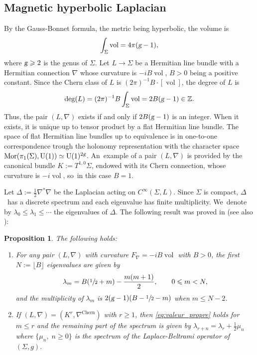 \documentclass[10pt]{amsart}
\theoremstyle{plain}
\newtheorem{proposition}[theorem]{Proposition}
\theoremstyle{definition}
\let\op\operatorname
\newcommand{\Z}{\mathbb{Z}}
\let\la\lambda
\let\Si\Sigma
\DeclareMathOperator{\vol}{vol}
\begin{document}
\subsection{Magnetic hyperbolic Laplacian} \label{ssection:landau} By the Gauss-Bonnet formula, the metric being
hyperbolic, the volume is
\begin{equation}
\int_{\Si} \vol = 4 \pi (\textsl{g} -1),
\end{equation}
where $\textsl{g}\geqslant
2 $ is the genus of $\Si$. Let $L \to \Sigma$ be a Hermitian line bundle with
a Hermitian connection
$\nabla$ whose curvature is $-i B \op{vol}
$, $B > 0$ being a positive constant. Since the Chern class of $L$ is $ (2
\pi)^{-1} B \cdot [ \op{vol}]$, the
degree of $L$ is
\begin{equation}
\label{equation:deg}
\mathrm{deg}(L) = (2 \pi)^{-1} B \int_{\Si} \vol = 2 B (\textsl{g}-1) \in \Z.
\end{equation}
Thus, the pair $(L,
\nabla)$ exists if and only if $2 B (\textsl{g}-1)$ is an integer. When it exists, it
is unique up to tensor product by a flat Hermitian line bundle. The
space of flat Hermitian line bundles up to equivalence is in one-to-one
correspondence trough the holonomy representation with the character space
$\op{Mor} (\pi_1 (\Si), \op{U}(1)) \simeq \op{U} (1)^{2\textsl{g}}$. An~example of a pair $(L, \nabla)$ is provided by the canonical bundle $K := T^{1,0} \Si$,
endowed with its Chern connection, whose curvature is $- i \vol$, so~in this
case $B=1$.

Let $\Delta := \frac{1}{2} \nabla^* \nabla $ be the Laplacian acting on $C^\infty
(\Si, L)$. Since $\Si$ is compact, $\Delta$~has a discrete spectrum and each
eigenvalue has finite multiplicity. We~denote by $\la_0 \leqslant \la_1
\leqslant \cdots $ the eigenvalues of $\Delta$. The following result was
proved in \cite{Iengo-Li-94} (see also \cite{Tejero-06, Landau2}):

\begin{proposition} \label{theo:Landau_Level}
The following holds:
\begin{enumerate}

\item For any pair $(L, \nabla)$ with curvature $F_\nabla=-iB
\op{vol}$ with $B>0$, the first $N := \lfloor B \rfloor $ eigenvalues are
given by
\begin{gather} \label{eq:valeur_propre}
\la_{m } = B (\sfrac{1}{2} + m) - \dfrac{ m (m+1) } {2},\qquad 0
\leqslant m < N,
\end{gather}
and the multiplicity of $\la_m$ is $2 (\textsl{g}-1)(B-\sfrac{1}{2} - m)$ when $m \leqslant N- 2$.

\item If $(L,\nabla) = (K^r,\nabla^{\mathrm{Chern}})$ with $ r \geq 1$, then \eqref{eq:valeur_propre} holds for
$m \leqslant r$ and the remaining part of the spectrum is given by
$\la_{r+n} = \la_r + \frac{1}{2} \mu_n$ where $\{ \mu_n, \; n \geq 0 \}$ is the
spectrum of the Laplace-Beltrami operator of $(\Sigma, g)$.
\end{enumerate}
\end{proposition}
\end{document}
